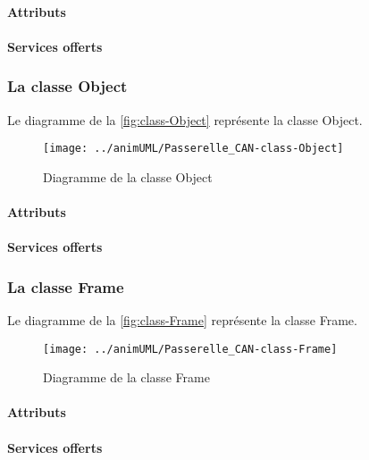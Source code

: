 \paragraph{Attributs}
\classLoggerProperties
\paragraph{Services offerts}
\classLoggerOperations
\subsubsection{La classe Object}

Le diagramme de la \autoref{fig:class-Object} représente la classe Object.
\begin{figure}[H]
	\centering
	\texttt{[image: ../animUML/Passerelle\_CAN-class-Object]}
	\caption{Diagramme de la classe Object}
	\label{fig:class-Object}
\end{figure}


\paragraph{Attributs}
\classObjectProperties
\paragraph{Services offerts}
\classObjectOperations
\subsubsection{La classe Frame}

Le diagramme de la \autoref{fig:class-Frame} représente la classe Frame.
\begin{figure}[H]
	\centering
	\texttt{[image: ../animUML/Passerelle\_CAN-class-Frame]}
	\caption{Diagramme de la classe Frame}
	\label{fig:class-Frame}
\end{figure}


\paragraph{Attributs}
\classFrameProperties
\paragraph{Services offerts}
\classFrameOperations

